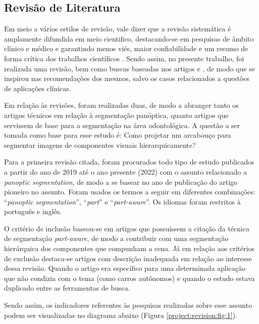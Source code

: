 \subsection{Revisão de Literatura}
\label{project:revision}
Em meio a vários estilos de revisão, vale dizer que a revisão sistemática é amplamente difundida em meio cientifico, destacando-se em pesquisas de âmbito clínico e médico e garantindo menos viés, maior confiabilidade e um resumo de forma crítica dos trabalhos científicos \cite{barbosa2019}. Sendo assim, no presente trabalho, foi realizada uma revisão, bem como buscas baseadas nos artigos \cite{barbosa2019} e \cite{liberati2009}, de modo que se inspirou nas recomendações dos mesmos, salvo os casos relacionados a questões de aplicações clínicas.

Em relação às revisões, foram realizadas duas, de modo a abranger tanto os artigos técnicos em relação à segmentação panóptica, quanto artigos que servissem de base para a segmentação na área odontológica. A questão a ser tomada como base para esse estudo é: Como projetar um arcabouço para segmentar imagens de componentes visuais hierarquicamente?

Para a primeira revisão citada, foram procurados todo tipo de estudo publicados a partir do ano de 2019 até o ano presente (2022) com o assunto relacionado a \textit{panoptic segmentation}, de modo a se basear no ano de publicação do artigo pioneiro \cite{Kirillov2019a} no assunto. Foram usados os termos a seguir em diferentes combinações: ``\textit{panoptic segmentation}'', ``\textit{part}'' e ``\textit{part-aware}''. Os idiomas foram restritos à português e inglês.

O critério de inclusão baseou-se em artigos que possuíssem a citação da técnica de segmentação \textit{part-aware}, de modo a contribuir com uma segmentação hierárquica dos componentes que compunham a cena. Já em relação aos critérios de exclusão destaca-se artigos com descrição inadequada em relação ao interesse dessa revisão. Quando o artigo era específico para uma determinada aplicação que não condizia com o tema (como carros autônomos) e quando o estudo estava duplicado entre as ferramentas de busca.

Sendo assim, os indicadores referentes às pesquisas realizadas sobre esse assunto podem ser visualizadas no diagrama abaixo (Figura \ref{project:revision:fig:1}).

